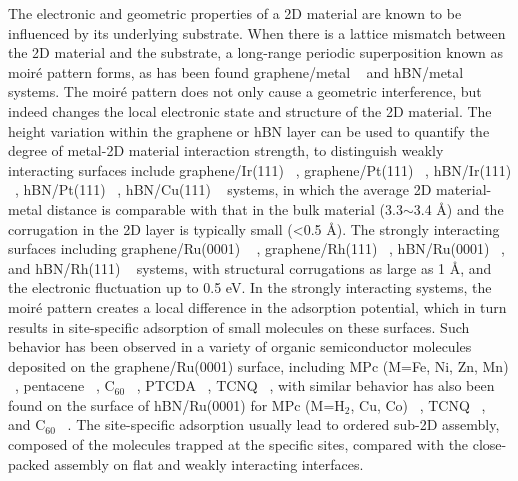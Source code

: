 The electronic and geometric properties of a 2D material are known to be
influenced by its underlying substrate. When there is a lattice
mismatch between the 2D material and the substrate, a long-range
periodic superposition known as moiré pattern forms, as has been
found graphene/metal ~\cite{Hamalainen_2013_moire_gr} and hBN/metal
~\cite{Schulz_2014_hBN_moire} systems.  The
moiré pattern does not only cause a geometric interference, but
indeed changes the local electronic state and structure of the 2D
material.
%
The height variation within the graphene or hBN layer can be used to
quantify the degree of metal-2D material interaction strength, to
distinguish weakly interacting surfaces include graphene/Ir(111)
~\cite{Pletikosi_2009_gr_Ir,Busse_2011_Gr_Ir,Hamalainen_2013_moire_gr},
graphene/Pt(111) ~\cite{Sutter_2009_Gr_Pt}, hBN/Ir(111)
~\cite{Schulz_2014_hBN_moire}, hBN/Pt(111) ~\cite{Cavar_2008_hBN_Pt},
hBN/Cu(111) ~\cite{Joshi_2012_hBN_Cu} systems, in which the average 2D
material-metal distance is comparable with that in the bulk material
(3.3$\sim{}$3.4 \AA{}) and the corrugation in the 2D layer is
typically small (<0.5 \AA{}). The strongly interacting surfaces
including graphene/\allowbreak{}Ru(0001) ~\cite{Moritz_2010_gr_Ru} , graphene/Rh(111) ~\cite{Wang_2010_gr_Rh}, hBN/Ru(0001)
~\cite{Wang_2010_gr_Rh}, and hBN/Rh(111) ~\cite{Dil_2008_hBN_Rh}
systems, with structural corrugations as large as 1 \AA{}, and the
electronic fluctuation up to 0.5 eV. In the strongly interacting
systems, the moiré pattern creates a local difference in the
adsorption potential, which in turn results in site-specific
adsorption of small molecules on these surfaces. Such behavior has
been observed in a variety of organic semiconductor molecules
deposited on the graphene/\allowbreak{}Ru(0001) surface, including MPc (M=Fe, Ni,
Zn, Mn) ~\cite{Mao_2009_Pc_gr_kagome,Zhang_2011_FePc_gr}, pentacene
~\cite{Zhou_2013_penta_gr_Ru}, C\(_{\text{60}}\)
~\cite{Li_2012_c60_gr_Ru}, PTCDA ~\cite{Zhou_2011_PTCDA_gr_Ru}, TCNQ
~\cite{Maccariello_2014_TCNQ_gr_Ru}, with similar behavior has also
been found on the surface of hBN/Ru(0001) for MPc (M=H\(_{\text{2}}\),
Cu, Co) ~\cite{Dil_2008_hBN_Rh,Jarvinen_2014_MPc_hBN_Ru}, TCNQ
~\cite{Joshi_2014_TCNQ_hBN}, and C\(_{\text{60}}\)
~\cite{Corso_2004_C60_hBN}. The site-specific adsorption usually lead
to ordered sub-2D assembly, composed of the molecules trapped at the
specific sites, compared with the close-packed assembly on flat and
weakly interacting interfaces.

